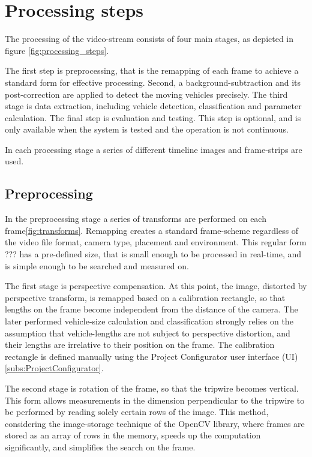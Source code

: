 \section{Processing steps}
The processing of the video-stream consists of four main stages, as depicted in figure \ref{fig:processing_steps}.

The first step is preprocessing, that is the remapping of each frame to achieve a standard form for effective processing.
Second, a background-subtraction and its post-correction are applied to detect the moving vehicles precisely.
The third stage is data extraction, including vehicle detection, classification and parameter calculation.
The final step is evaluation and testing. 
This step is optional, and is only available when the system is tested and the operation is not continuous.

In each processing stage a series of different timeline images and frame-strips are used.
\subsection{Preprocessing}
In the preprocessing stage a series of transforms are performed on each frame\ref{fig:transforms}.
Remapping creates a standard frame-scheme regardless of the video file format, camera type, placement and environment.
This regular form ??? has a pre-defined size, that is small enough to be processed in real-time, and is simple enough to be searched and measured on.

The first stage is perspective compensation.
At this point, the image, distorted by perspective transform, is remapped based on a calibration rectangle, so that lengths on the frame become independent from the distance of the camera.
The later performed vehicle-size calculation and classification strongly relies on the assumption that vehicle-lengths are not subject to perspective distortion, and their lengths are irrelative to their position on the frame.
The calibration rectangle is defined manually using the Project Configurator user interface (UI)\ref{subs:ProjectConfigurator}.

The second stage is rotation of the frame, so that the tripwire becomes vertical.
This form allows measurements in the dimension perpendicular to the tripwire to be performed by reading solely certain rows of the image.
This method, considering the image-storage technique of the OpenCV library, where frames are stored as an array of rows in the memory, speeds up the computation significantly, and simplifies the search on the frame.

